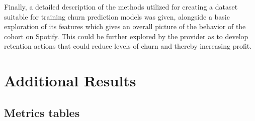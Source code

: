 \documentclass{kththesis}
\begin{document}
Finally, a detailed description of the methods utilized for creating a dataset suitable for training churn prediction models was given, alongside a basic exploration of its features which gives an overall picture of the behavior of the cohort on Spotify. This could be further explored by the provider as to develop retention actions that could reduce levels of churn and thereby increasing profit.  



\appendix

\chapter{Additional Results}
\label{cha:add_results}

\section{Metrics tables}

\end{document}
